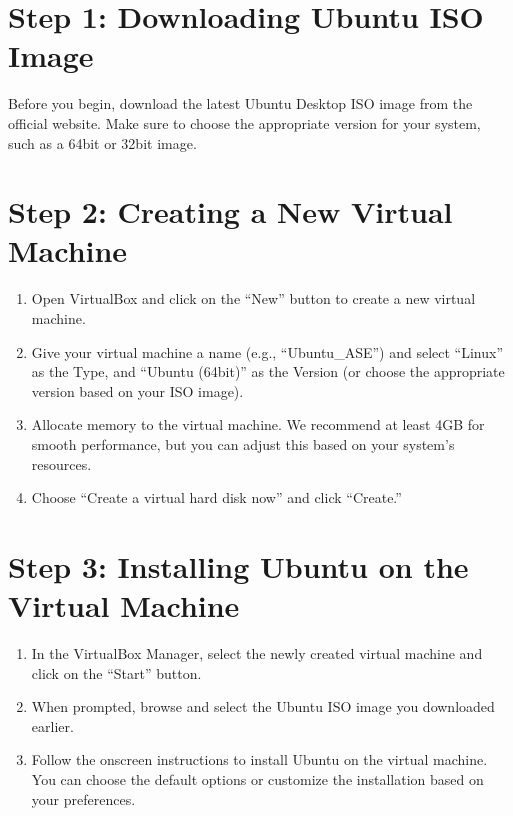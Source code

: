 \documentclass[letterpaper,10pt,english]{sphinxmanual}
\begin{document}
\section{Step 1: Downloading Ubuntu ISO Image}
\label{\detokenize{vbox/vbox:step-1-downloading-ubuntu-iso-image}}
\sphinxAtStartPar
Before you begin, download the latest Ubuntu Desktop ISO image from the official website. Make sure to choose the appropriate version for your system, such as a 64\sphinxhyphen{}bit or 32\sphinxhyphen{}bit image.

\sphinxAtStartPar
{}


\section{Step 2: Creating a New Virtual Machine}
\label{\detokenize{vbox/vbox:step-2-creating-a-new-virtual-machine}}\begin{enumerate}
%
\item {} 
\sphinxAtStartPar
Open VirtualBox and click on the “New” button to create a new virtual machine.

\item {} 
\sphinxAtStartPar
Give your virtual machine a name (e.g., “Ubuntu\_ASE”) and select “Linux” as the Type, and “Ubuntu (64\sphinxhyphen{}bit)” as the Version (or choose the appropriate version based on your ISO image).

\item {} 
\sphinxAtStartPar
Allocate memory to the virtual machine. We recommend at least 4GB for smooth performance, but you can adjust this based on your system’s resources.

\item {} 
\sphinxAtStartPar
Choose “Create a virtual hard disk now” and click “Create.”

\end{enumerate}


\section{Step 3: Installing Ubuntu on the Virtual Machine}
\label{\detokenize{vbox/vbox:step-3-installing-ubuntu-on-the-virtual-machine}}\begin{enumerate}
%
\item {} 
\sphinxAtStartPar
In the VirtualBox Manager, select the newly created virtual machine and click on the “Start” button.

\item {} 
\sphinxAtStartPar
When prompted, browse and select the Ubuntu ISO image you downloaded earlier.

\item {} 
\sphinxAtStartPar
Follow the on\sphinxhyphen{}screen instructions to install Ubuntu on the virtual machine. You can choose the default options or customize the installation based on your preferences.

\end{enumerate}
\end{document}
